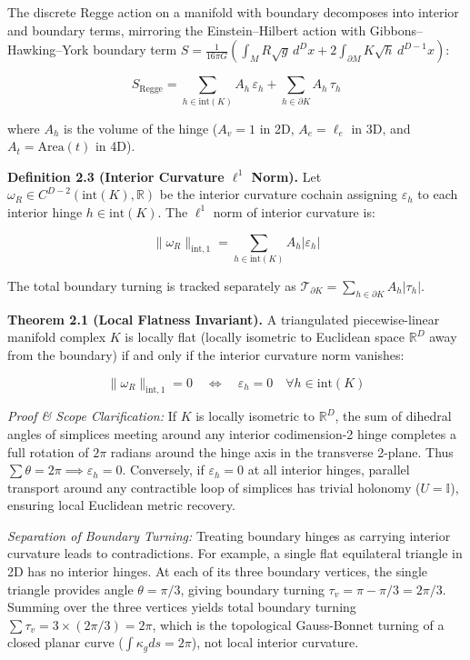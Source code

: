 \documentclass[11pt]{article}
\begin{document}
The discrete Regge action on a manifold with boundary decomposes into interior and boundary terms, mirroring the Einstein--Hilbert action with Gibbons--Hawking--York boundary term $S = \frac{1}{16\pi G} \left( \int_M R \sqrt{g} \, d^D x + 2 \int_{\partial M} K \sqrt{h} \, d^{D-1} x \right)$:

\begin{equation*}
S_{\mathrm{Regge}} = \sum_{h \in \mathrm{int}(K)} A_h \, \varepsilon_h + \sum_{h \in \partial K} A_h \, \tau_h
\end{equation*}

where $A_h$ is the volume of the hinge ($A_v = 1$ in 2D, $A_e = \ell_e$ in 3D, and $A_t = \mathrm{Area}(t)$ in 4D).

\textbf{Definition 2.3 (Interior Curvature $\ell^1$ Norm).} Let $\omega_R \in C^{D-2}(\mathrm{int}(K), \mathbb{R})$ be the interior curvature cochain assigning $\varepsilon_h$ to each interior hinge $h \in \mathrm{int}(K)$. The $\ell^1$ norm of interior curvature is:

\begin{equation*}
\|\omega_R\|_{\mathrm{int}, 1} = \sum_{h \in \mathrm{int}(K)} A_h |\varepsilon_h|
\end{equation*}

The total boundary turning is tracked separately as $\mathcal{T}_{\partial K} = \sum_{h \in \partial K} A_h |\tau_h|$.

\textbf{Theorem 2.1 (Local Flatness Invariant).} A triangulated piecewise-linear manifold complex $K$ is locally flat (locally isometric to Euclidean space $\mathbb{R}^D$ away from the boundary) if and only if the interior curvature norm vanishes:

\begin{equation*}
\|\omega_R\|_{\mathrm{int}, 1} = 0 \quad \Longleftrightarrow \quad \varepsilon_h = 0 \quad \forall h \in \mathrm{int}(K)
\end{equation*}

\emph{Proof \& Scope Clarification:} If $K$ is locally isometric to $\mathbb{R}^D$, the sum of dihedral angles of simplices meeting around any interior codimension-2 hinge completes a full rotation of $2\pi$ radians around the hinge axis in the transverse 2-plane. Thus $\sum \theta = 2\pi \implies \varepsilon_h = 0$. Conversely, if $\varepsilon_h = 0$ at all interior hinges, parallel transport around any contractible loop of simplices has trivial holonomy ($U = \mathbb{I}$), ensuring local Euclidean metric recovery.

\emph{Separation of Boundary Turning:} Treating boundary hinges as carrying interior curvature leads to contradictions. For example, a single flat equilateral triangle in 2D has no interior hinges. At each of its three boundary vertices, the single triangle provides angle $\theta = \pi/3$, giving boundary turning $\tau_v = \pi - \pi/3 = 2\pi/3$. Summing over the three vertices yields total boundary turning $\sum \tau_v = 3 \times (2\pi/3) = 2\pi$, which is the topological Gauss-Bonnet turning of a closed planar curve ($\int \kappa_g ds = 2\pi$), not local interior curvature.
\end{document}
